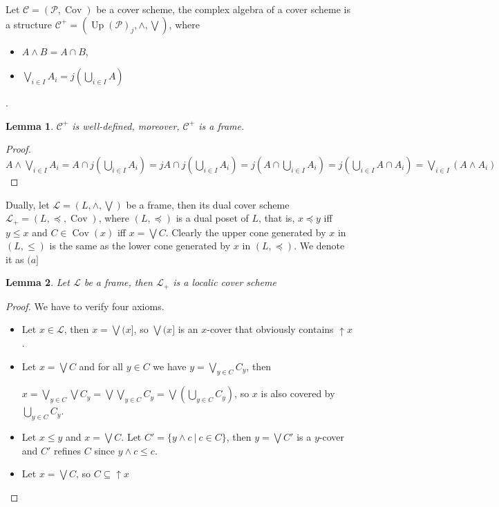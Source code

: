\documentclass[a4paper]{article}
\theoremstyle{defin}
\theoremstyle{theorem}
\theoremstyle{claim}
\theoremstyle{prop}
\theoremstyle{lemma}
\newtheorem{lemma}{Lemma}
\theoremstyle{fact}
\theoremstyle{ex}
\theoremstyle{col}
\begin{document}
Let $\mathcal{C} = (\mathcal{P}, \operatorname{Cov})$ be a cover scheme, the complex algebra of a cover scheme is a structure $\mathcal{C}^{+} = (\operatorname{Up}(\mathcal{P})_j, \wedge, \bigvee)$, where
\begin{itemize}
\item $A \wedge B = A \cap B$,
\item $\bigvee \limits_{i \in I} A_i = j(\bigcup \limits_{i \in I} A)$
\end{itemize}.

\begin{lemma}
$\mathcal{C}^{+}$ is well-defined, moreover, $\mathcal{C}^{+}$ is a frame.
\end{lemma}

\begin{proof}
$A \wedge \bigvee \limits_{i \in I} A_i = A \cap j (\bigcup \limits_{i \in I} A_i) = j A \cap j (\bigcup \limits_{i \in I} A_i) = j (A \cap \bigcup \limits_{i \in I} A_i) = j (\bigcup \limits_{i \in I} A \cap A_i) = \bigvee \limits_{i \in I} (A \wedge A_i)$
\end{proof}

Dually, let $\mathcal{L} = (L, \wedge, \bigvee)$ be a frame, then its dual cover scheme $\mathcal{L}_+ = (L, \preceq, \operatorname{Cov})$, where $(L, \preceq)$ is a dual poset of $L$, that is, $x \preceq y$ iff $y \leq x$ and $C \in \operatorname{Cov}(x)$ iff $x = \bigvee C$. Clearly the upper cone generated by $x$ in $(L, \leq)$ is the same as the lower cone generated by $x$ in $(L, \preceq)$. We denote it as $(a]$

\begin{lemma} Let $\mathcal{L}$ be a frame, then $\mathcal{L}_+$ is a localic cover scheme
\end{lemma}
\begin{proof}
We have to verify four axioms.

\begin{itemize}
\item Let $x \in \mathcal{L}$, then $x = \bigvee (x]$, so $\bigvee (x]$ is an $x$-cover that obviously contains $\uparrow x$.
\item Let $x = \bigvee C$ and for all $y \in C$ we have $y = \bigvee \limits_{y \in C} C_y$, then
\begin{center}
$x = \bigvee \limits_{y \in C} \bigvee C_y = \bigvee \bigvee \limits_{y \in C} C_y = \bigvee (\bigcup \limits_{y \in C} C_y)$, so $x$ is also covered by $\bigcup \limits_{y \in C} C_y$.
\end{center}
\item Let $x \leq y$ and $x = \bigvee C$. Let $C' = \{ y \wedge c \: | \: c \in C \}$, then $y = \bigvee C'$ is a $y$-cover and $C'$ refines $C$ since $y \wedge c \leq c$.
\item Let $x = \bigvee C$, so $C \subseteq \uparrow x$
\end{itemize}
\end{proof}
\end{document}

